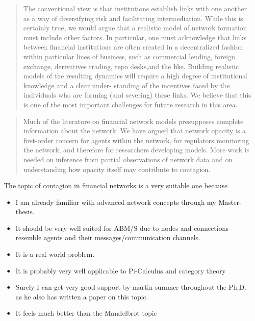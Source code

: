 \begin{quote}
The conventional view is that institutions establish links with one another as a way of diversifying risk and facilitating intermediation. While this is certainly true, we would argue that a realistic model of network formation must include other factors. In particular, one must acknowledge that links between financial institutions are often created in a decentralized fashion within particular lines of business, such as commercial lending, foreign exchange, derivatives trading, repo desks,and the like. Building realistic models of the resulting dynamics will require a high degree of institutional knowledge and a clear under- standing of the incentives faced by the individuals who are forming (and severing) these links. We believe that this is one of the most important challenges for future research in this area.
\end{quote}

\begin{quote}
Much of the literature on financial network models presupposes complete information about the network. We have argued that network opacity is a first-order concern for agents within the network, for regulators monitoring the network, and therefore for researchers developing models. More work is needed on inference from partial observations of network data and on understanding how opacity itself may contribute to contagion.
\end{quote}

The topic of contagion in financial networks is a very suitable one because

\begin{itemize}
\item I am already familiar with advanced network concepts through my Master-thesis.
\item It should be very well suited for ABM/S due to nodes and connections resemble agents and their messages/communication channels.
\item It is a real world problem.
\item It is probably very well applicable to Pi-Calculus and category theory
\item Surely I can get very good support by martin summer throughout the Ph.D. as he also has written a paper on this topic.
\item It feels much better than the Mandelbrot topic
\end{itemize}